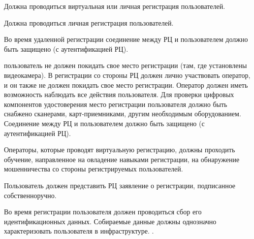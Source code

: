 



Должна проводиться виртуальная или личная регистрация пользователей.

Должна проводиться личная регистрация пользователей.

Во время удаленной регистрации соединение между РЦ и пользователем должно быть 
защищено (с аутентификацией РЦ).

 пользователь не должен покидать свое
место регистрации (там, где установлены видеокамера). В регистрации со стороны
РЦ должен лично участвовать оператор, и он также не должен покидать свое место
регистрации.
%
Оператор должен иметь возможность наблюдать все действия пользователя.
%
Для проверки цифровых компонентов удостоверения место регистрации пользователя
должно быть снабжено сканерами, карт-приемниками, другим необходимым
оборудованием.
%
Соединение между РЦ и пользователем должно быть защищено (с аутентификацией РЦ).


Операторы, которые проводят виртуальную регистрацию, должны проходить обучение, 
направленное на овладение навыками регистрации, на обнаружение мошенничества со 
стороны регистрируемых пользователей.
%

Пользователь должен представить РЦ заявление о регистрации, подписанное 
собственноручно.


Во время регистрации пользователя должен проводиться сбор его идентификационных
данных. Собираемые данные должны однозначно характеризовать пользователя
в инфраструктуре. .

